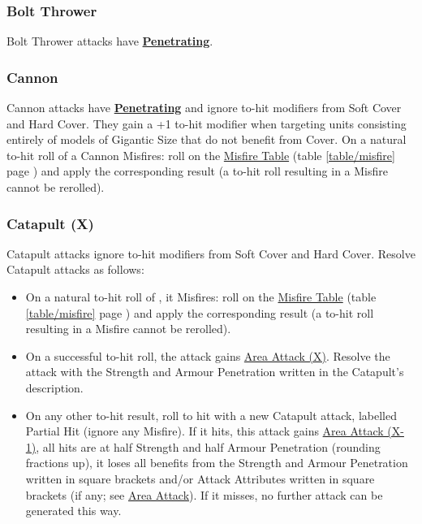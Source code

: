 \subsubsection{Bolt Thrower}
\label{bolt_thrower}

Bolt Thrower attacks have \hyperref[penetrating]{\textbf{Penetrating}}.

\subsubsection{Cannon}
\label{cannon}

Cannon attacks have \hyperref[penetrating]{\textbf{Penetrating}} and ignore to-hit modifiers from Soft Cover and Hard Cover. They gain a +1 to-hit modifier when targeting units consisting entirely of models of Gigantic Size that do not benefit from Cover. On a natural to-hit roll of  a Cannon Misfires: roll on the \hyperref[the_misfire_table]{Misfire Table} (table \ref{table/misfire} page \pageref{table/misfire}) and apply the corresponding result (a to-hit roll resulting in a Misfire cannot be rerolled).

\subsubsection{Catapult (X)}
\label{catapult}

Catapult attacks ignore to-hit modifiers from Soft Cover and Hard Cover. Resolve Catapult attacks as follows:

\begin{itemize}[label={-}]
\item On a natural to-hit roll of , it Misfires: roll on the \hyperref[the_misfire_table]{Misfire Table} (table \ref{table/misfire} page \pageref{table/misfire}) and apply the corresponding result (a to-hit roll resulting in a Misfire cannot be rerolled).
\item On a successful to-hit roll, the attack gains \hyperref[area_attack]{Area Attack (X)}. Resolve the attack with the Strength and Armour Penetration written in the Catapult's description.
\item On any other to-hit result, roll to hit with a new Catapult attack, labelled Partial Hit (ignore any Misfire). If it hits, this attack gains \hyperref[area_attack]{Area Attack (X-1)}, all hits are at half Strength and half Armour Penetration (rounding fractions up), it loses all benefits from the Strength and Armour Penetration written in square brackets and/or Attack Attributes written in square brackets (if any; see \hyperref[area_attack]{Area Attack}). If it misses, no further attack can be generated this way.
\end{itemize}


